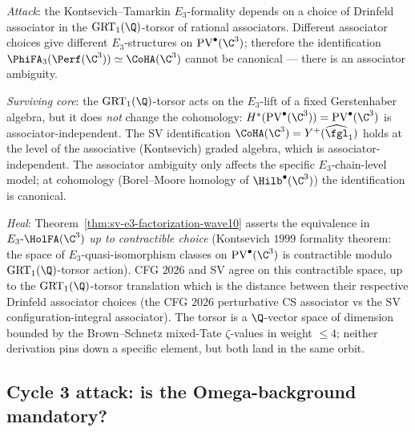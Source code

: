 \begin{remark}
\label{rem:cycle-2-attack-heal-wave10}
\emph{Attack}: the Kontsevich--Tamarkin $E_3$-formality depends on a
choice of Drinfeld associator in the $\mathrm{GRT}_1(\Q)$-torsor of
rational associators. Different associator choices give different
$E_3$-structures on $\mathrm{PV}^\bullet(\C^3)$; therefore the
identification $\PhiFA_3(\Perf(\C^3)) \simeq \CoHA(\C^3)$ cannot be
canonical — there is an associator ambiguity.

\emph{Surviving core}: the $\mathrm{GRT}_1(\Q)$-torsor acts on the
$E_3$-lift of a fixed Gerstenhaber algebra, but it does \emph{not}
change the cohomology: $H^*(\mathrm{PV}^\bullet(\C^3)) =
\mathrm{PV}^\bullet(\C^3)$ is associator-independent. The SV
identification $\CoHA(\C^3) = Y^+(\widehat{\fgl}_1)$ holds at the
level of the associative (Kontsevich) graded algebra, which is
associator-independent. The associator ambiguity only affects the
specific $E_3$-chain-level model; at cohomology (Borel--Moore homology
of $\Hilb^\bullet(\C^3)$) the identification is canonical.

\emph{Heal}: Theorem~\ref{thm:sv-e3-factorization-wave10} asserts the
equivalence in $E_3\text{-}\HolFA(\C^3)$ \emph{up to contractible
choice} (Kontsevich $1999$ formality theorem: the space of
$E_3$-quasi-isomorphism classes on $\mathrm{PV}^\bullet(\C^3)$ is
contractible modulo $\mathrm{GRT}_1(\Q)$-torsor action). CFG $2026$
and SV agree on this contractible space, up to the
$\mathrm{GRT}_1(\Q)$-torsor translation which is the distance between
their respective Drinfeld associator choices (the CFG $2026$
perturbative CS associator vs the SV configuration-integral
associator). The torsor is a $\Q$-vector space of dimension bounded
by the Brown--Schnetz mixed-Tate $\zeta$-values in weight $\leq 4$;
neither derivation pins down a specific element, but both land in the
same orbit.
\end{remark}

\subsection*{Cycle 3 attack: is the Omega-background mandatory?}

